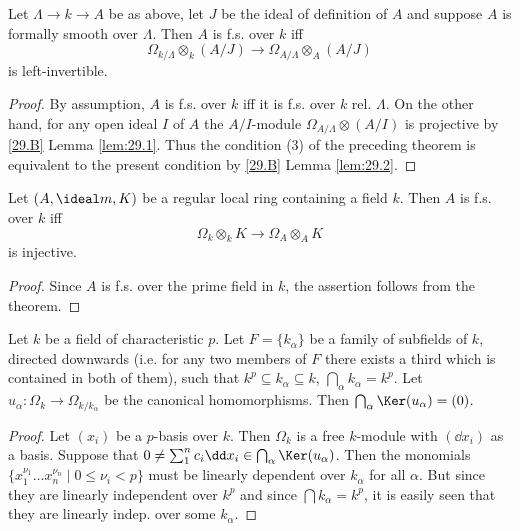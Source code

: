 \documentclass[../main]{subfiles}
\begin{document}
\begin{partheorem}
\label{thm:066}
Let $\Lambda \longrightarrow k \longrightarrow A$ be as above, let $J$ be the ideal of definition of $A$ and suppose $A$ is formally smooth over $\Lambda$. Then $A$ is f.s. over $k$ iff
\[
\Omega_{k/\Lambda} \otimes_k (A/J) \longrightarrow \Omega_{A/\Lambda} \otimes_A (A/J)
\]
is left-invertible. 
\end{partheorem}

\begin{proof}
By assumption, $A$ is f.s. over $k$ iff it is f.s. over $k$ rel. $\Lambda$. On the other hand, for any open ideal $I$ of $A$ the $A/I$-module $\Omega_{A/\Lambda} \otimes (A/I)$ is projective by \ref{29.B} Lemma \ref{lem:29.1}. Thus the condition (3) of the preceding theorem is equivalent to the present condition by \ref{29.B} Lemma \ref{lem:29.2}. 
\end{proof}

\begin{corollary}
Let $(A, \ideal m, K)$ be a regular local ring containing a field $k$. Then $A$ is f.s. over $k$ iff
\[
\Omega_k \otimes_k K \longrightarrow \Omega_A \otimes_A K
\]
is injective.
\end{corollary}

\begin{proof}
Since $A$ is f.s. over the prime field in $k$, the assertion follows from the theorem.
\end{proof}

\begin{parlemma}\label{lem:30.01}
Let $k$ be a field of characteristic $p$. Let $F = \{k_\alpha\}$ be a family of subfields of $k$, directed downwards (i.e. for any two members of $F$ there exists a third which is contained in both of them), such that $k^p \subseteq k_\alpha \subseteq k$, $\bigcap_\alpha k_\alpha = k^p$. Let $u_\alpha : \Omega_k \longrightarrow \Omega_{k/k_\alpha}$ be the canonical homomorphisms. Then $\bigcap_\alpha \Ker(u_\alpha) = (0)$.
\end{parlemma}

\begin{proof}
Let $(x_i)$ be a $p$-basis over $k$. Then $\Omega_k$ is a free $k$-module with $(\dd x_i)$ as a basis. Suppose that $0 \ne \sum_1^n c_i \dd x_i \in \bigcap_\alpha \Ker(u_\alpha)$. Then the monomials $\{x_1^{\nu_1} \ldots x_n^{\nu_n} \mid 0 \le \nu_i < p\}$ must be linearly dependent over $k_\alpha$ for all $\alpha$. But since they are linearly independent over $k^p$ and since $\bigcap k_\alpha = k^p$, it is easily seen that they are linearly indep. over some $k_\alpha$. 
\end{proof}
\end{document}
